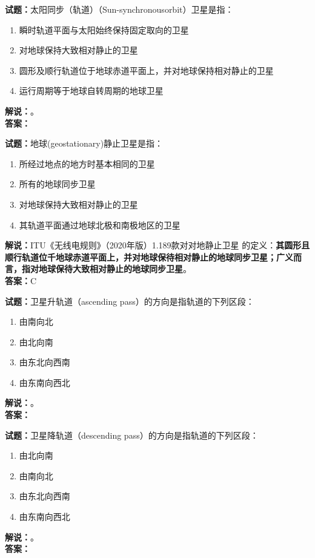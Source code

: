 \documentclass{ctexbook}
\begin{document}
\vspace{\baselineskip}

\noindent\textbf{试题：}太阳同步（轨道）（Sun-synchronousorbit）卫星是指：
\begin{enumerate}[leftmargin=3em]
  \item 瞬时轨道平面与太阳始终保持固定取向的卫星
  \item 对地球保持大致相对静止的卫星
  \item 圆形及顺行轨道位于地球赤道平面上，并对地球保持相对静止的卫星
  \item 运行周期等于地球自转周期的地球卫星
\end{enumerate}
\noindent\textbf{解说：}\textbf{}。\\\noindent\textbf{答案：}

\vspace{\baselineskip}

\noindent\textbf{试题：}地球(geostationary)静止卫星是指：
\begin{enumerate}[leftmargin=3em]
  \item 所经过地点的地方时基本相同的卫星
  \item 所有的地球同步卫星
  \item 对地球保持大致相对静止的卫星
  \item 其轨道平面通过地球北极和南极地区的卫星
\end{enumerate}
\noindent\textbf{解说：}ITU《无线电规则》（2020年版）1.189款对对地静止卫星
的定义：\textbf{其圆形且顺行轨道位千地球赤道平面上，并对地球保待相对静止的地球同步卫星；广义而言，指对地球保待大致相对静止的地球同步卫星}。\\\noindent\textbf{答案：}C

\vspace{\baselineskip}

\noindent\textbf{试题：}卫星升轨道（ascending pass）的方向是指轨道的下列区段：
\begin{enumerate}[leftmargin=3em]
  \item 由南向北
  \item 由北向南
  \item 由东北向西南
  \item 由东南向西北
\end{enumerate}
\noindent\textbf{解说：}\textbf{}。\\\noindent\textbf{答案：}

\vspace{\baselineskip}

\noindent\textbf{试题：}卫星降轨道（descending pass）的方向是指轨道的下列区段：
\begin{enumerate}[leftmargin=3em]
  \item 由北向南
  \item 由南向北
  \item 由东北向西南
  \item 由东南向西北
\end{enumerate}
\noindent\textbf{解说：}\textbf{}。\\\noindent\textbf{答案：}
\end{document}
